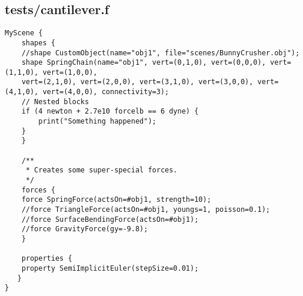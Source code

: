 \subsection*{tests/cantilever.f}
\begin{lstlisting}
MyScene {
    shapes {
	//shape CustomObject(name="obj1", file="scenes/BunnyCrusher.obj");
	shape SpringChain(name="obj1", vert=(0,1,0), vert=(0,0,0), vert=(1,1,0), vert=(1,0,0), 
	vert=(2,1,0), vert=(2,0,0), vert=(3,1,0), vert=(3,0,0), vert=(4,1,0), vert=(4,0,0), connectivity=3);
	// Nested blocks
	if (4 newton + 2.7e10 forcelb == 6 dyne) {
	    print("Something happened");
	}
    }

    /**
     * Creates some super-special forces.
     */
    forces {
	force SpringForce(actsOn=#obj1, strength=10);
	//force TriangleForce(actsOn=#obj1, youngs=1, poisson=0.1);
	//force SurfaceBendingForce(actsOn=#obj1);
	//force GravityForce(gy=-9.8);
    }

    properties { 
	property SemiImplicitEuler(stepSize=0.01);
   }
}
\end{lstlisting}

